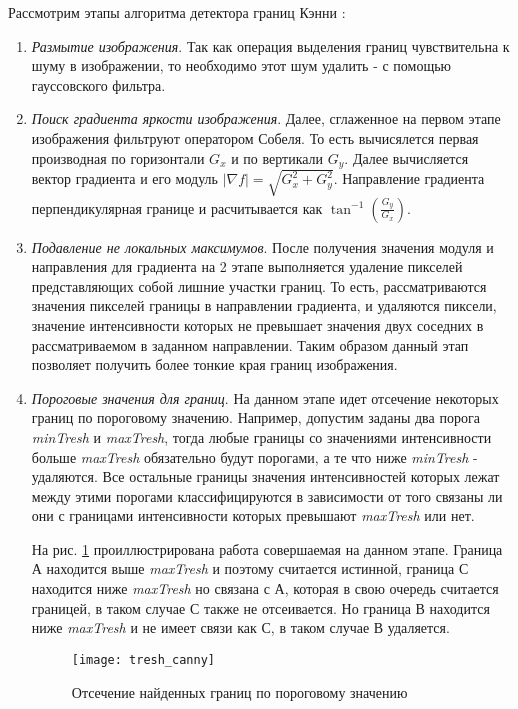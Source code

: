 Рассмотрим этапы алгоритма детектора границ Кэнни \cite{Booklet}:  \label{canny_algo}
\begin{enumerate}[1.]
	\item \textit{Размытие изображения}. Так как операция выделения границ чувствительна к шуму в изображении, то необходимо этот шум удалить - с помощью гауссовского фильтра.
	
	\item \textit{Поиск градиента яркости изображения}. Далее, сглаженное на первом этапе изображения фильтруют оператором Собеля. То есть вычисялется первая производная по горизонтали $G_x$ и по вертикали $G_y$. Далее вычисляется вектор градиента и его модуль  $|\nabla f| = \sqrt{G_x^2 + G_y^2}$. Направление градиента перпендикулярная границе и расчитывается как $\tan^{-1} (\frac{G_y}{G_x})$.
	
	\item \textit{Подавление не локальных максимумов}. После получения значения модуля и направления для градиента на 2 этапе выполняется удаление пикселей представляющих собой лишние участки границ. То есть, рассматриваются значения пикселей границы в направлении градиента, и удаляются пиксели, значение интенсивности которых не превышает значения двух соседних в рассматриваемом в заданном направлении. Таким образом данный этап позволяет получить более тонкие края границ изображения.
	
	\item \textit{Пороговые значения для границ}. На данном этапе идет отсечение некоторых границ по пороговому значению. Например, допустим заданы два порога \textit{minTresh} и \textit{maxTresh}, тогда любые границы со значениями интенсивности больше \textit{maxTresh} обязательно будут порогами, а те что ниже \textit{minTresh} - удаляются. Все остальные границы значения интенсивностей которых лежат между этими порогами классифицируются в зависимости от того связаны ли они с границами интенсивности которых превышают \textit{maxTresh} или нет.
	
	На рис. \ref{tresh_canny} проиллюстрирована работа совершаемая на данном этапе. Граница А находится выше \textit{maxTresh} и поэтому считается истинной, граница С находится ниже \textit{maxTresh} но связана с А, которая в свою очередь считается границей, в таком случае С также не отсеивается. Но граница В находится ниже \textit{maxTresh} и не имеет связи как С, в таком случае В удаляется. \cite{Booklet}
	
	\begin{figure}[H]
		\centering
		\texttt{[image: tresh\_canny]}
		\caption{Отсечение найденных границ по пороговому значению}
		\label{tresh_canny}
	\end{figure}
\end{enumerate}


